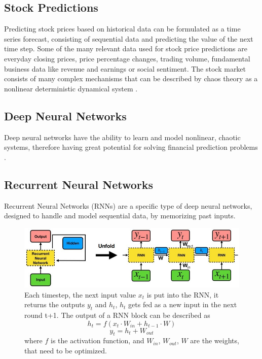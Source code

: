 \subsection{Stock Predictions}
Predicting stock prices based on historical data can be formulated as a time series forecast, consisting of sequential data and predicting the value of the next time step. Some of the many relevant data used for stock price predictions are everyday closing prices, price percentage changes, trading volume, fundamental business data like revenue and earnings or social sentiment. 
The stock market consists of many complex mechanisms that can be described by chaos theory as a nonlinear deterministic dynamical system \cite{KLIOUTCHNIKOV2017368, lawrence1997using}.

\subsection{Deep Neural Networks}
Deep neural networks have the ability to learn and model nonlinear, chaotic systems, therefore having great potential for solving financial prediction problems \cite{heaton2018deep}.



\subsection{Recurrent Neural Networks}
Recurrent Neural Networks (RNNs) are a specific type of deep neural networks, designed to handle and model sequential data, by memorizing past inputs.

\begin{figure}[h]
\centering
  \includegraphics[width=1.0\columnwidth]{gfx/rnn}
  \hfill
 \caption{\cite{chen2020quantum} Each timestep, the next input value $x_t$ is put into the RNN, it returns the outputs $y_t$ and $h_t$, $h_t$ gets fed as a new input in the next round t+1.
 The output of a RNN block can be described as 
 \[h_t = f(x_t \cdot W_{in} + h_{t-1} \cdot W)\] 
 \[y_t = h_t + W_{out}\] 
 where $f$ is the activation function, and $W_{in}$, $W_{out}$, $W$ are the weights, that need to be optimized.}
 \label{fig:rnn}
\end{figure}

